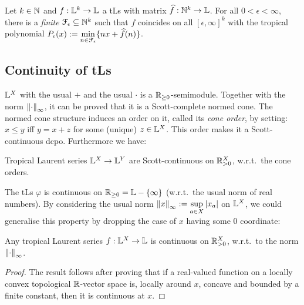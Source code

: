 \begin{theorem}\label{theorem:fepsilon}
 Let $k\in\mathbb{N}$ and $f:\mathbb{L}^k\to\mathbb{L}$ a tLs with matrix $\widehat f:\mathbb{N}^k\to\mathbb{L}$.
 For all $0<\epsilon<\infty$, there is a \emph{finite} $\mathcal{F}_\epsilon \subseteq \mathbb{N}^k$ such that 
% 
$f$ coincides on all $[\epsilon,\infty]^k$ with the tropical {polynomial} $P_\epsilon(x):=\min\limits_{n\in \mathcal{F}_\epsilon}\{nx+\widehat f(n)\}$.
\end{theorem}




\subsection{Continuity of tLs}%

$\mathbb{L}^X$ with the usual $+$ and the usual $\cdot$ is a $\mathbb{R}_{\geq0}$-semimodule.
Together with the norm $\left\lVert\cdot\right\rVert_\infty$, it can be proved that it is a Scott-complete normed cone.
The normed cone structure induces an order on it, called its \emph{cone order}, by setting:
$x\leq y$ iff $y=x+z$ for some (unique) $z\in\mathbb{L}^X$.
This order makes it a Scott-continuous dcpo.
Furthermore we have:

\begin{proposition}
  Tropical Laurent series $\mathbb{L}^X\to\mathbb{L}^Y$ are Scott-continuous on $\mathbb{R}_{>0}^X$, w.r.t.\ the cone orders.
\end{proposition}
The tLs $\varphi$ is continuous on $\mathbb{R}_{\geq0}=\mathbb{L}-\{\infty\}$ (w.r.t.\ the usual norm of real numbers).
By considering the usual norm $\left\lVert x\right\rVert_\infty:=\sup\limits_{a\in X} \left\lvert x_a\right\rvert$ on $\mathbb{L}^X$, we could generalise this property by dropping the case of $x$ having some $0$ coordinate:

\begin{theorem}\label{thm:cont}
 Any tropical Laurent series $f:\mathbb{L}^X\to\mathbb{L}$ is continuous on $\mathbb{R}_{>0}^X$, w.r.t.\ to the norm $\left\lVert\cdot\right\rVert_\infty$.
\end{theorem}
\begin{proof}
 The result follows after proving that if a real-valued function on a locally convex topological $\mathbb{R}$-vector space is, locally around $x$, concave and bounded by a finite constant, then it is continuous at $x$.
\end{proof}


